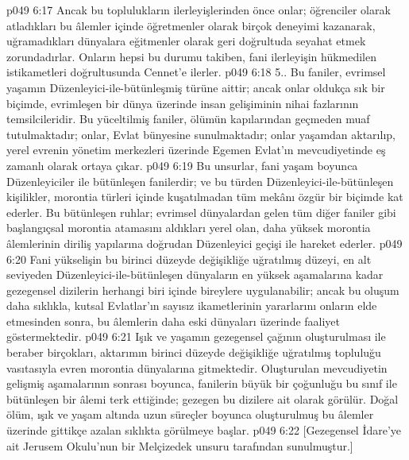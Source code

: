 \vs p049 6:17 Ancak bu toplulukların ilerleyişlerinden önce onlar; öğrenciler olarak atladıkları bu âlemler içinde öğretmenler olarak birçok deneyimi kazanarak, uğramadıkları dünyalara eğitmenler olarak geri doğrultuda seyahat etmek zorundadırlar. Onların hepsi bu durumu takiben, fani ilerleyişin hükmedilen istikametleri doğrultusunda Cennet’e ilerler.
\vs p049 6:18 5.\bibnobreakspace {}. Bu faniler, evrimsel yaşamın Düzenleyici\hyp{}ile\hyp{}bütünleşmiş türüne aittir; ancak onlar oldukça sık bir biçimde, evrimleşen bir dünya üzerinde insan gelişiminin nihai fazlarının temsilcileridir. Bu yüceltilmiş faniler, ölümün kapılarından geçmeden muaf tutulmaktadır; onlar, Evlat bünyesine sunulmaktadır; onlar yaşamdan aktarılıp, yerel evrenin yönetim merkezleri üzerinde Egemen Evlat’ın mevcudiyetinde eş zamanlı olarak ortaya çıkar.
\vs p049 6:19 Bu unsurlar, fani yaşam boyunca Düzenleyiciler ile bütünleşen fanilerdir; ve bu türden Düzenleyici\hyp{}ile\hyp{}bütünleşen kişilikler, morontia türleri içinde kuşatılmadan tüm mekânı özgür bir biçimde kat ederler. Bu bütünleşen ruhlar; evrimsel dünyalardan gelen tüm diğer faniler gibi başlangıçsal morontia atamasını aldıkları yerel olan, daha yüksek morontia âlemlerinin diriliş yapılarına doğrudan Düzenleyici geçişi ile hareket ederler.
\vs p049 6:20 Fani yükselişin bu birinci düzeyde değişikliğe uğratılmış düzeyi, en alt seviyeden Düzenleyici\hyp{}ile\hyp{}bütünleşen dünyaların en yüksek aşamalarına kadar gezegensel dizilerin herhangi biri içinde bireylere uygulanabilir; ancak bu oluşum daha sıklıkla, kutsal Evlatlar’ın sayısız ikametlerinin yararlarını onların elde etmesinden sonra, bu âlemlerin daha eski dünyaları üzerinde faaliyet göstermektedir.
\vs p049 6:21 Işık ve yaşamın gezegensel çağının oluşturulması ile beraber birçokları, aktarımın birinci düzeyde değişikliğe uğratılmış topluluğu vasıtasıyla evren morontia dünyalarına gitmektedir. Oluşturulan mevcudiyetin gelişmiş aşamalarının sonrası boyunca, fanilerin büyük bir çoğunluğu bu sınıf ile bütünleşen bir âlemi terk ettiğinde; gezegen bu dizilere ait olarak görülür. Doğal ölüm, ışık ve yaşam altında uzun süreçler boyunca oluşturulmuş bu âlemler üzerinde gittikçe azalan sıklıkta görülmeye başlar.
\vs p049 6:22 [Gezegensel İdare’ye ait Jerusem Okulu’nun bir Melçizedek unsuru tarafından sunulmuştur.]
